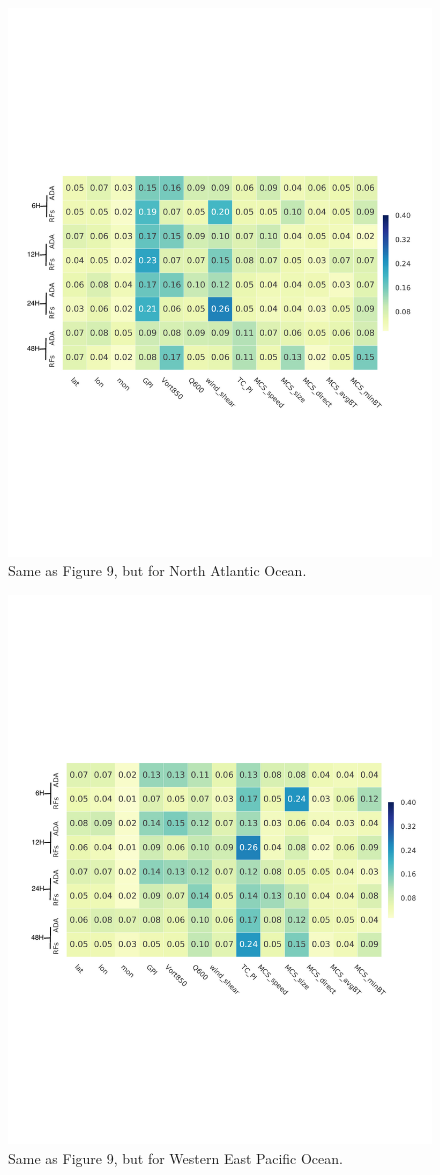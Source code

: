 \documentclass{article}
\begin{document}
\begin{figure}[h] %
\includegraphics[width=30pc]{figs/imp_NA.pdf}
\caption{Same as Figure 9, but for North Atlantic Ocean.}
\label{figone}
\end{figure}

\begin{figure}[h] %
\includegraphics[width=30pc]{figs/imp_WNP.pdf}
\caption{Same as Figure 9, but for Western East Pacific Ocean.}
\label{figone}
\end{figure}
\end{document}
